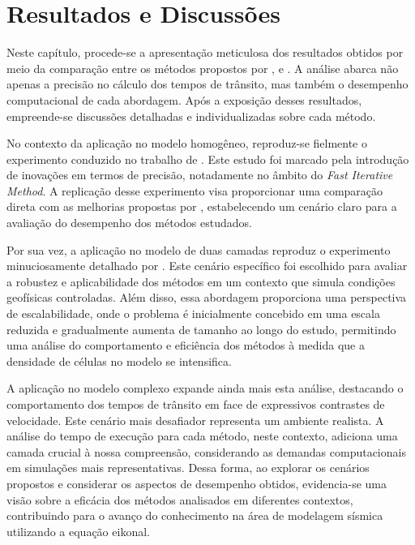 \chapter{Resultados e Discussões}
\label{ch:resultados}

Neste capítulo, procede-se a apresentação meticulosa dos resultados obtidos por meio da comparação entre os métodos propostos por ,  e . A análise abarca não apenas a precisão no cálculo dos tempos de trânsito, mas também o desempenho computacional de cada abordagem. Após a exposição desses resultados, empreende-se discussões detalhadas e individualizadas sobre cada método.

No contexto da aplicação no modelo homogêneo, reproduz-se fielmente o experimento conduzido no trabalho de . Este estudo foi marcado pela introdução de inovações em termos de precisão, notadamente no âmbito do \textit{Fast Iterative Method}. A replicação desse experimento visa proporcionar uma comparação direta com as melhorias propostas por , estabelecendo um cenário claro para a avaliação do desempenho dos métodos estudados.

Por sua vez, a aplicação no modelo de duas camadas reproduz o experimento minuciosamente detalhado por . Este cenário específico foi escolhido para avaliar a robustez e aplicabilidade dos métodos em um contexto que simula condições geofísicas controladas. Além disso, essa abordagem proporciona uma perspectiva de escalabilidade, onde o problema é inicialmente concebido em uma escala reduzida e gradualmente aumenta de tamanho ao longo do estudo, permitindo uma análise do comportamento e eficiência dos métodos à medida que a densidade de células no modelo se intensifica.

A aplicação no modelo complexo expande ainda mais esta análise, destacando o comportamento dos tempos de trânsito em face de expressivos contrastes de velocidade. Este cenário mais desafiador representa um ambiente realista. A análise do tempo de execução para cada método, neste contexto, adiciona uma camada crucial à nossa compreensão, considerando as demandas computacionais em simulações mais representativas. Dessa forma, ao explorar os cenários propostos e considerar os aspectos de desempenho obtidos, evidencia-se uma visão sobre a eficácia dos métodos analisados em diferentes contextos, contribuindo para o avanço do conhecimento na área de modelagem sísmica utilizando a equação eikonal.

